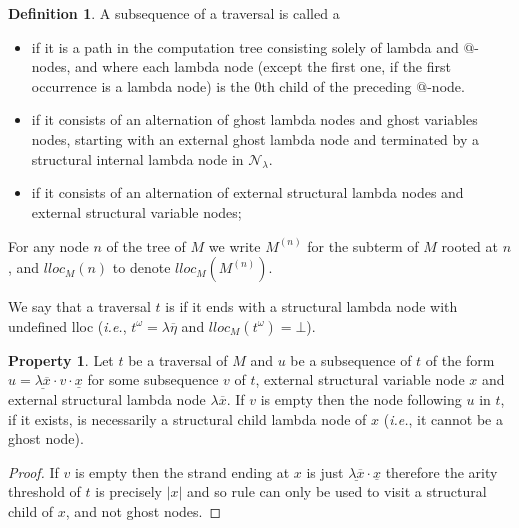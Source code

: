 \documentclass{article}
\makeatletter
\theoremstyle{plain}
\theoremstyle{definition}
\newtheorem{definition}{Definition}[section]
\newtheorem{property}{Property}[section]
\theoremstyle{remark}
\newcommand\Nodes{\mathcal{N}}%
\newcommand\NodesLmd{\Nodes_\lambda}%
\renewcommand\ie{{\it i.e.\@\xspace}}
\makeatother
\begin{document}
\begin{definition}
A subsequence of a traversal is called a
\begin{itemize}
\item {} if it is a path in the computation tree consisting solely of lambda and $@$-nodes, and where each lambda node (except the first one, if the first occurrence is a lambda node) is the $0$th child of the preceding $@$-node.
\item {} if it consists of an alternation of ghost lambda nodes and ghost variables nodes, starting with an external ghost lambda node and terminated by a structural internal lambda node in $\NodesLmd$.
\item {} if it consists of an alternation of external structural lambda nodes and external structural variable nodes;
\end{itemize}
\end{definition}

For any node $n$ of the tree of $M$ we write $M^{(n)}$ for the subterm of $M$ rooted at $n$, and $lloc_M(n)$ to denote $lloc_M(M^{(n)})$.

We say that a traversal $t$ is  if it ends with a structural lambda node with undefined lloc (\ie, $t^\omega = \lambda\overline\eta$ and $lloc_M(t^\omega) = \bot$).

\begin{property}
\label{prop:strand_spinaldescent}
Let $t$ be a traversal of $M$ and $u$ be a subsequence of $t$ of the form
$u = \underline{\lambda \overline{x}} \cdot v \cdot \underline{x}$
for some subsequence $v$ of $t$, external structural variable node $x$ and external structural lambda node $\lambda \overline{x}$.
If $v$ is empty then the node following $u$ in $t$, if it exists, is necessarily a structural child lambda node of $x$ (\ie, it cannot be a ghost node).
\end{property}
\begin{proof}
 If $v$ is empty then the strand ending at $x$
 is just $\underline{\lambda \overline{x}} \cdot \underline{x}$ therefore
 the arity threshold of $t$ is precisely $|x|$ and so rule  can only be used to visit a structural child of $x$, and not ghost nodes.
\end{proof}
\end{document}

